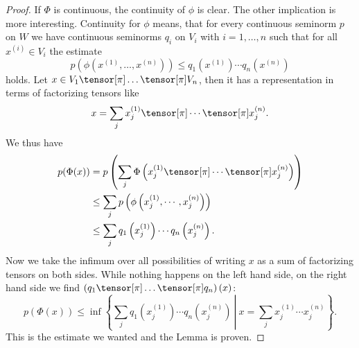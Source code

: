 \begin{proof}
	If $\Phi$ is continuous, the continuity of $\phi$ is clear. 
	The other implication is more interesting.
	Continuity for $\phi$ means, that for every continuous seminorm $p$ on 
	$W$ we have continuous seminorms $q_i$ on $V_i$ with $i = 1, \ldots, n$ 
	such that for all $x^{(i)} \in V_i$ the estimate
	\begin{equation}
		\label{LCAna:ContiFactorTensors}
		p \left(
			\phi\left( x^{(1)}, \ldots, x^{(n)} \right)
		\right)
		\leq
		q_1 \left( x^{(1)} \right) 
		\cdots 
		q_n \left( x^{(n)} \right)
	\end{equation}
	holds. Let $x \in V_1 \tensor[\pi] \ldots \tensor[\pi] V_n$, then it 
	has a representation in terms of factorizing tensors like
	\begin{equation*}
		x
		=
		\sum_j
		x_j^{(1)} 
		\tensor[\pi] \cdots \tensor[\pi] 
		x_j^{(n)}.
	\end{equation*}
	We thus have
	\begin{align*}
		p( \Phi(x) )
		& =
		p \left(
			\sum_j
			\Phi \left(
				x_j^{(1)} 
				\tensor[\pi] \cdots \tensor[\pi] 
				x_j^{(n)}
			\right)
		\right)
		\\
		& \leq
		\sum_j
		p \left(
			\phi \left(
				x_j^{(1)} 
				, \cdots ,
				x_j^{(n)}
			\right)
		\right)
		\\
		& \leq
		\sum_j
		q_1 \left( x_j^{(1)} \right) 
		\cdots 
		q_n \left( x_j^{(n)} \right).
	\end{align*}
	Now we take the infimum over all possibilities of writing $x$ as a sum of 
	factorizing tensors on both sides. While nothing happens on the left 
	hand side, on the right hand side we find $\left( q_1 \tensor[\pi] 
	\ldots \tensor[\pi] q_n \right)(x)$: 
	\begin{equation*}
		p( \Phi(x) )
		\leq
		\inf
		\left\{
		\left.
			\sum_j
			q_1 \left( x_j^{(1)} \right) 
			\cdots 
			q_n \left( x_j^{(n)} \right)
		\ \right| \
			x
			=
			\sum_j
			x_j^{(1)} \cdots x_j^{(n)}
		\right\}.
	\end{equation*}
	This is the estimate we wanted and the Lemma is proven.
\end{proof}


